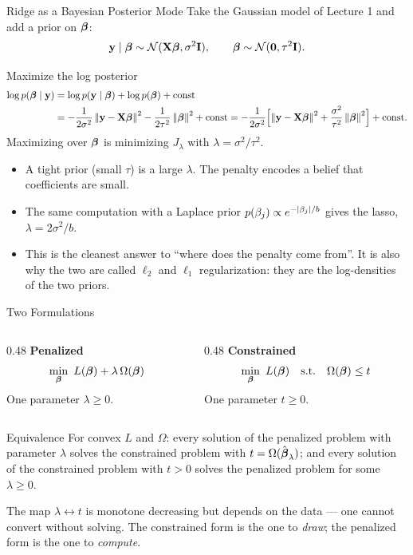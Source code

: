 \documentclass[11pt,aspectratio=169]{beamer}
\begin{document}
\begin{frame}{Ridge as a Bayesian Posterior Mode}\small
Take the Gaussian model of Lecture 1 and add a prior on $\boldsymbol{\beta}$:
\[
\mathbf{y}\mid\boldsymbol{\beta}\sim\mathcal{N}(\mathbf{X}\boldsymbol{\beta},\sigma^2\mathbf{I}),\qquad\boldsymbol{\beta}\sim\mathcal{N}(\mathbf{0},\tau^2\mathbf{I}).
\]
\begin{derivation}{Maximize the log posterior}
\begin{align*}
\log p(\boldsymbol{\beta}\mid\mathbf{y})&=\log p(\mathbf{y}\mid\boldsymbol{\beta})+\log p(\boldsymbol{\beta})+\text{const}\\
&=-\frac{1}{2\sigma^2}\left\lVert \mathbf{y}-\mathbf{X}\boldsymbol{\beta} \right\rVert^2-\frac{1}{2\tau^2}\left\lVert \boldsymbol{\beta} \right\rVert^2+\text{const}
=-\frac{1}{2\sigma^2}\Bigl[\left\lVert \mathbf{y}-\mathbf{X}\boldsymbol{\beta} \right\rVert^2+\frac{\sigma^2}{\tau^2}\left\lVert \boldsymbol{\beta} \right\rVert^2\Bigr]+\text{const}.
\end{align*}
Maximizing over $\boldsymbol{\beta}$ is minimizing $J_\lambda$ with $\lambda=\sigma^2/\tau^2$.
\end{derivation}
\begin{itemize}
  \item A tight prior (small $\tau$) is a large $\lambda$. The penalty encodes a belief that coefficients are small.
  \item The same computation with a Laplace prior $p(\beta_j)\propto e^{-\left\lvert \beta_j \right\rvert/b}$ gives the lasso, $\lambda=2\sigma^2/b$.
  \item This is the cleanest answer to ``where does the penalty come from''. It is also why the two are called
        $\ell_2$ and $\ell_1$ regularization: they are the log-densities of the two priors.
\end{itemize}
\end{frame}


\begin{frame}{Two Formulations}
\begin{columns}[T]
\begin{column}{0.48\textwidth}
\textbf{Penalized}
\[
\min_{\vbeta}\ L(\vbeta)+\lambda\,\Omega(\vbeta)
\]
One parameter $\lambda\ge0$.
\end{column}
\begin{column}{0.48\textwidth}
\textbf{Constrained}
\[
\min_{\vbeta}\ L(\vbeta)\quad\text{s.t.}\quad\Omega(\vbeta)\le t
\]
One parameter $t\ge0$.
\end{column}
\end{columns}
\vspace{10pt}
\begin{claim}{Equivalence}
For convex $L$ and $\Omega$: every solution of the penalized problem with parameter $\lambda$ solves the
constrained problem with $t=\Omega(\hat{\boldsymbol{\beta}}_\lambda)$; and every solution of the constrained problem with
$t>0$ solves the penalized problem for some $\lambda\ge0$.
\end{claim}
The map $\lambda\leftrightarrow t$ is monotone decreasing but depends on the data --- one cannot convert
without solving. The constrained form is the one to \emph{draw}; the penalized form is the one to \emph{compute}.
\end{frame}
\end{document}
